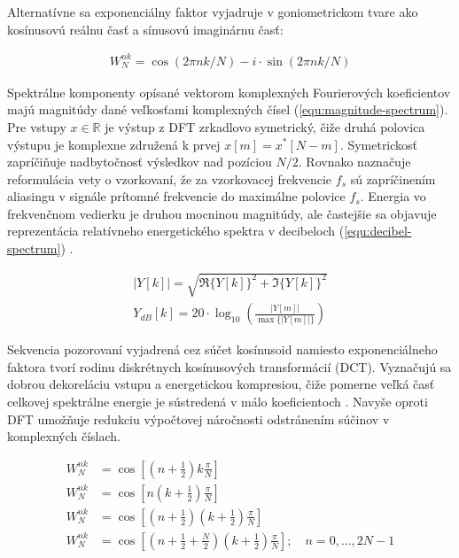 Alternatívne sa exponenciálny faktor vyjadruje v goniometrickom tvare ako kosínusovú reálnu časť a sínusovú imaginárnu časť:
\begin{ceqn}\begin{align}
W_{N}^{nk} = \cos(2\pi nk/ N) - i \cdot \sin(2\pi nk/ N)
\end{align}\end{ceqn}

Spektrálne komponenty opísané vektorom komplexných Fourierových koeficientov majú magnitúdy dané veľkosťami komplexných čísel
(\ref{equ:magnitude-spectrum}). Pre vstupy $x \in \mathbb{R}$ je výstup z DFT zrkadlovo symetrický, čiže druhá polovica
výstupu je komplexne združená k prvej $x[m] = x^{*}[N - m]$. Symetrickosť zapríčiňuje nadbytočnosť výsledkov
nad pozíciou  $N/2$. Rovnako naznačuje reformulácia vety o vzorkovaní, že za vzorkovacej frekvencie $f_s$ sú zapríčinením aliasingu v signále prítomné frekvencie do maximálne polovice $f_s$. Energia vo frekvenčnom vedierku je druhou mocninou magnitúdy, ale častejšie sa
objavuje reprezentácia relatívneho energetického spektra v decibeloch (\ref{equ:decibel-spectrum}) \cite{understanding-dsp}.
\begin{ceqn}\begin{align}
|Y[k]| = \sqrt{\Re\{Y[k]\}^2 + \Im\{Y[k]\}^2} \label{equ:magnitude-spectrum} \\
Y_{dB}[k] = 20 \cdot \log_{10}{ \left( \frac{|Y[m]|}{\max\{|Y[m]|\}} \right)} \label{equ:decibel-spectrum}
\end{align}\end{ceqn}

Sekvencia pozorovaní vyjadrená cez súčet kosínusoid namiesto exponenciálneho faktora tvorí rodinu diskrétnych
kosínusových transformácií (DCT). Vyznačujú sa dobrou dekoreláciu vstupu a energetickou kompresiou, čiže pomerne veľká
časť celkovej spektrálne energie je sústredená v málo koeficientoch \cite{dct-applications}. Navyše oproti DFT umožňuje redukciu
výpočtovej náročnosti odstránením súčinov v komplexných číslach.

\begin{ceqn}\begin{align}
\tag{DCT-II} W_{N}^{nk} &= \cos{\left[\left(n + \frac{1}{2}\right) k\frac{\pi}{N}\right]} \\
\tag{DCT-III} W_{N}^{nk} &= \cos{\left[n \left(k + \frac{1}{2} \right) \frac{\pi}{N}\right]}  \\
\tag{DCT-IV} W_{N}^{nk} &= \cos{\left[\left(n + \frac{1}{2} \right) \left(k + \frac{1}{2} \right) \frac{\pi}{N} \right]} \\
\tag{MDCT} W_{N}^{nk} &= \cos{\left[\left(n + \frac{1}{2} + \frac{N}{2} \right) \left(k + \frac{1}{2} \right) \frac{\pi}{N} \right]};\quad n = 0, \dots, 2N - 1
\end{align}\end{ceqn}

